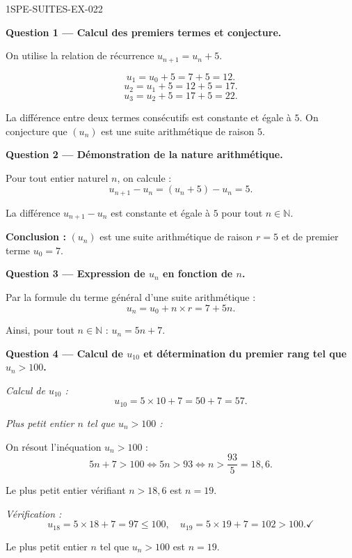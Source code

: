 \begin{corrige}{1SPE-SUITES-EX-022}

\textbf{Question 1 — Calcul des premiers termes et conjecture.}

On utilise la relation de récurrence $u_{n+1} = u_n + 5$.

\[
  u_1 = u_0 + 5 = 7 + 5 = 12.
\]
\[
  u_2 = u_1 + 5 = 12 + 5 = 17.
\]
\[
  u_3 = u_2 + 5 = 17 + 5 = 22.
\]


La différence entre deux termes consécutifs est constante et égale à $5$. On conjecture que $(u_n)$ est une suite arithmétique de raison $5$.

\medskip
\textbf{Question 2 — Démonstration de la nature arithmétique.}

Pour tout entier naturel $n$, on calcule :
\[
  u_{n+1} - u_n = (u_n + 5) - u_n = 5.
\]


La différence $u_{n+1} - u_n$ est constante et égale à $5$ pour tout $n \in \mathbb{N}$.

\textbf{Conclusion :} $(u_n)$ est une suite arithmétique de raison $r = 5$ et de premier terme $u_0 = 7$.

\medskip
\textbf{Question 3 — Expression de $u_n$ en fonction de $n$.}

Par la formule du terme général d'une suite arithmétique :
\[
  u_n = u_0 + n \times r = 7 + 5n.
\]


Ainsi, pour tout $n \in \mathbb{N}$ : $\boxed{u_n = 5n + 7}$.

\medskip
\textbf{Question 4 — Calcul de $u_{10}$ et détermination du premier rang tel que $u_n > 100$.}

\textit{Calcul de $u_{10}$ :}
\[
  u_{10} = 5 \times 10 + 7 = 50 + 7 = 57.
\]

\textit{Plus petit entier $n$ tel que $u_n > 100$ :}

On résout l'inéquation $u_n > 100$ :
\[
  5n + 7 > 100 \iff 5n > 93 \iff n > \frac{93}{5} = 18{,}6.
\]


Le plus petit entier vérifiant $n > 18{,}6$ est $n = 19$.

\textit{Vérification :}
\[
  u_{18} = 5 \times 18 + 7 = 97 \leq 100, \quad u_{19} = 5 \times 19 + 7 = 102 > 100. \checkmark
\]

Le plus petit entier $n$ tel que $u_n > 100$ est $\boxed{n = 19}$.

\end{corrige}

